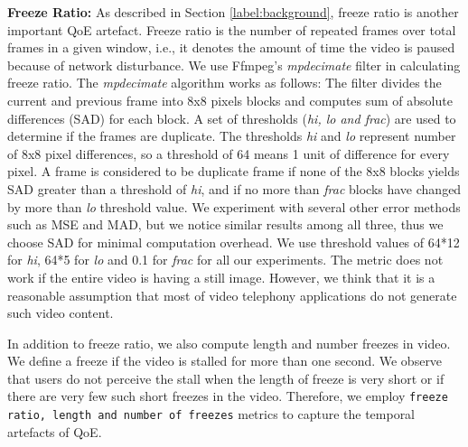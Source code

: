 
\noindent \textbf{Freeze Ratio:} As described in Section \ref{label:background}, freeze ratio is another important QoE artefact. 
Freeze ratio is the number of repeated frames over total frames in a given window, i.e., it denotes the amount of time the video is paused because of network disturbance. 
We use Ffmpeg's \textit{mpdecimate} \cite{ffmpeg} filter in calculating freeze ratio. 
The \textit{mpdecimate} algorithm works as follows: The filter divides the current and previous frame into 8x8 pixels blocks  and computes sum of absolute differences (SAD) for each block. 
A set of thresholds (\textit{hi, lo and frac}) are used to determine if the frames are duplicate. 
The thresholds \textit{hi} and \textit{lo} represent number of 8x8 pixel differences, so a threshold of 64 means 1 unit of difference for every pixel. A
frame is considered to be duplicate frame if none of the 8x8 blocks yields SAD greater than a threshold of \textit{hi}, and if no more than \textit{frac} blocks have changed by more than \textit{lo} threshold value. 
We experiment with several other error methods such as MSE and MAD, but we notice similar results among all three, thus we choose SAD for minimal computation overhead. 
We use threshold values of 64*12 for \textit{hi}, 64*5 for \textit{lo} and 0.1 for \textit{frac} for all our experiments. 
The metric does not work if the entire video is having a still image.%
However, we think that it is a reasonable assumption that most of video telephony applications do not generate such video content.

In addition to freeze ratio, we also compute length and number freezes in video. We define a freeze if the video is stalled for more than one second. We observe that users do not perceive the stall when the length of freeze is very short or if there are very few such short freezes in the video. Therefore, we employ \texttt{freeze ratio, length and number of freezes} metrics to capture the temporal artefacts of QoE.

